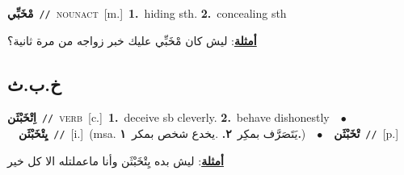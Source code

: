 \documentclass[10pt,a4paper,twoside]{article} %
\begin{document}
\begin{multicols}{2}
{\setlength\topsep{0pt}\textbf{\foreignlanguage{arabic}{مْخَبِّي}}\ {\color{gray}\texttt{//}\color{black}}\ \textsc{noun\textunderscore act}\ [m.]\ \textbf{1.}~hiding sth.  \textbf{2.}~concealing sth\  \begin{flushright}\color{gray}\foreignlanguage{arabic}{\textbf{\underline{\foreignlanguage{arabic}{أمثلة}}}: ليش كان مْخَبِّي عليك خبر زواجه من مرة ثانية؟}\end{flushright}\color{black}} \vspace{2mm}

\vspace{-3mm}
\subsection*{\color{blue}\foreignlanguage{arabic}{خ.ب.ث}\color{blue}{}} 

{\setlength\topsep{0pt}\textbf{\foreignlanguage{arabic}{اِتْخَبْثَن}}\ {\color{gray}\texttt{//}\color{black}}\ \textsc{verb}\ [c.]\ \textbf{1.}~deceive sb cleverly.  \textbf{2.}~behave dishonestly\ \ $\bullet$\ \ \setlength\topsep{0pt}\textbf{\foreignlanguage{arabic}{يِتْخَبْثَن}}\ {\color{gray}\texttt{//}\color{black}}\ [i.]\ \color{gray}(msa. \foreignlanguage{arabic}{يَتَصَرَّف بمكِر}~\foreignlanguage{arabic}{\textbf{٢.}}  .\foreignlanguage{arabic}{يخدع شخص بمكر}~\foreignlanguage{arabic}{\textbf{١.}})\color{black}\ \ $\bullet$\ \ \setlength\topsep{0pt}\textbf{\foreignlanguage{arabic}{تْخَبْثَن}}\ {\color{gray}\texttt{//}\color{black}}\ [p.]\  \begin{flushright}\color{gray}\foreignlanguage{arabic}{\textbf{\underline{\foreignlanguage{arabic}{أمثلة}}}: ليش بده يِتْخَبْثَن وأنا ماعملتله الا كل خير}\end{flushright}\color{black}} \vspace{2mm}


\end{multicols}
\end{document}
